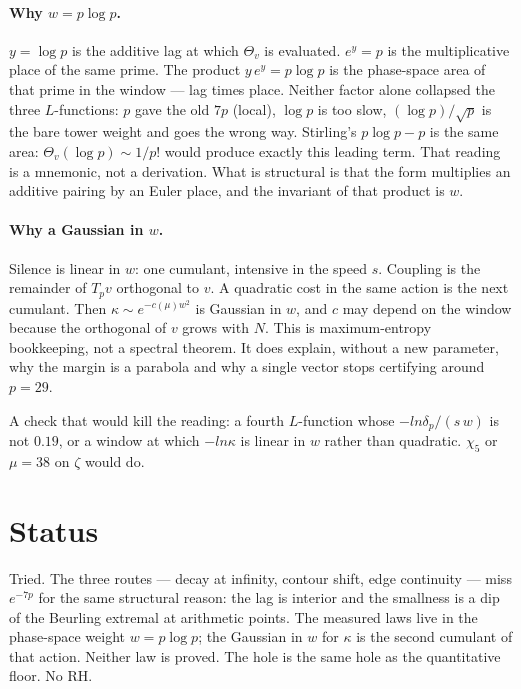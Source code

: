 \documentclass[11pt]{article}
\theoremstyle{remark}\newtheorem*{remark}{Remark}
\begin{document}
\paragraph{Why $w=p\log p$.}
$y=\log p$ is the additive lag at which $\Theta_v$ is evaluated.
$e^y=p$ is the multiplicative place of the same prime. The product
$y\,e^y=p\log p$ is the phase-space area of that prime in the
window --- lag times place. Neither factor alone collapsed the three
$L$-functions: $p$ gave the old $7p$ (local), $\log p$ is too slow,
$(\log p)/\sqrt p$ is the bare tower weight and goes the wrong way.
Stirling's $p\log p-p$ is the same area: $\Theta_v(\log p)\sim1/p!$
would produce exactly this leading term. That reading is a mnemonic,
not a derivation. What is structural is that the form multiplies an
additive pairing by an Euler place, and the invariant of that product
is $w$.

\paragraph{Why a Gaussian in $w$.}
Silence is linear in $w$: one cumulant, intensive in the speed $s$.
Coupling is the remainder of $T_pv$ orthogonal to $v$. A quadratic
cost in the same action is the next cumulant. Then $\kappa\sim
e^{-c(\mu)w^2}$ is Gaussian in $w$, and $c$ may depend on the window
because the orthogonal of $v$ grows with $N$. This is maximum-entropy
bookkeeping, not a spectral theorem. It does explain, without a new
parameter, why the margin is a parabola and why a single vector
stops certifying around $p=29$.

A check that would kill the reading: a fourth $L$-function whose
$-ln\delta_p/(s\,w)$ is not $0.19$, or a window at which $-ln\kappa$
is linear in $w$ rather than quadratic. $\chi_5$ or $\mu=38$ on
$\zeta$ would do.

\section*{Status}
Tried. The three routes --- decay at infinity, contour shift, edge
continuity --- miss $e^{-7p}$ for the same structural reason: the lag
is interior and the smallness is a dip of the Beurling extremal at
arithmetic points. The measured laws live in the phase-space weight
$w=p\log p$; the Gaussian in $w$ for $\kappa$ is the second cumulant
of that action. Neither law is proved. The hole is the same hole as
the quantitative floor. No RH.
\end{document}
